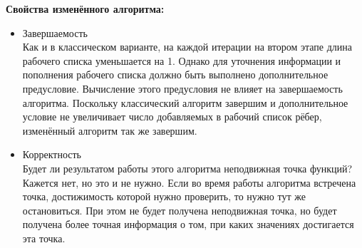 \textbf{Свойства изменённого алгоритма:}
\begin{itemize}
  \item Завершаемость\\
    Как и в классическом варианте, на каждой итерации на втором этапе
    длина рабочего списка уменьшается на 1. Однако для уточнения
    информации и пополнения рабочего списка должно быть выполнено
    дополнительное предусловие. Вычисление этого предусловия не влияет
    на завершаемость алгоритма. Поскольку классический алгоритм
    завершим и дополнительное условие не увеличивает число добавляемых
    в рабочий список рёбер, изменённый алгоритм так же завершим.
  \item Корректность\\
    Будет ли результатом работы этого алгоритма неподвижная точка
    функций? Кажется нет, но это и не нужно. Если во время работы
    алгоритма встречена точка, достижимость которой нужно проверить,
    то нужно тут же остановиться. При этом не будет получена
    неподвижная точка, но будет получена более точная информация о
    том, при каких значениях достигается эта точка.
\end{itemize}%
